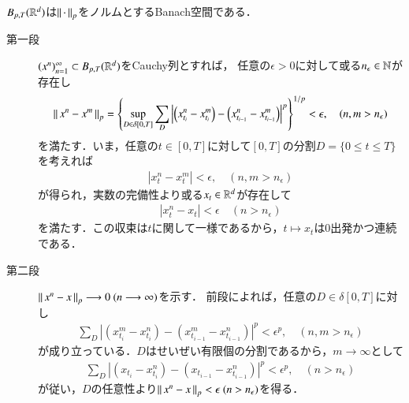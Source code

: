 \begin{screen}
	\begin{thm}
		$B_{p,T}(\mathbb{R}^d)$は$\left\|\, \cdot\, \right\|_{p}$をノルムとするBanach空間である．
	\end{thm}
\end{screen}

\begin{prf}\mbox{}
	\begin{description}
		\item[第一段] $(x^n)_{n=1}^{\infty} \subset B_{p,T}(\mathbb{R}^d)$をCauchy列とすれば，
			任意の$\epsilon > 0$に対して或る$n_\epsilon \in \mathbb{N}$が存在し
			\begin{align}
				\left\|\, x^n - x^m\, \right\|_{p}
				= \left\{ \operatorname*{sup}_{D \in \delta[0,T]} \sum_{D} 
				\left| \left( x^n_{t_i} - x^m_{t_i} \right) 
				- \left(x^n_{t_{i-1}} - x^m_{t_{i-1}} \right) \right|^p \right\}^{1/p} < \epsilon,
				\quad (n,m > n_\epsilon)
			\end{align}
			を満たす．いま，任意の$t \in [0,T]$に対して$[0,T]$の分割$D = \{0 \leq t \leq T\}$
			を考えれば
			\begin{align}
				|x^n_t - x^m_t| < \epsilon,
				\quad (n,m > n_\epsilon)
			\end{align}
			が得られ，実数の完備性より或る$x_t \in \mathbb{R}^d$が存在して
			\begin{align}
				|x^n_t - x_t| < \epsilon
				\quad (n > n_\epsilon)
			\end{align}
			を満たす．この収束は$t$に関して一様であるから，$t \longmapsto x_t$は0出発かつ連続である．
			
		\item[第二段] $\left\|\, x^n - x\, \right\|_{p} \longrightarrow 0\ (n \longrightarrow \infty)$を示す．
			前段によれば，任意の$D \in \delta[0,T]$に対し
			\begin{align}
				\sum_D \left| (x^m_{t_i} - x^n_{t_i}) - (x^m_{t_{i-1}} - x^n_{t_{i-1}}) \right|^p
				< \epsilon^p,
				\quad (n,m > n_\epsilon)
			\end{align}
			が成り立っている．$D$はせいぜい有限個の分割であるから，$m \longrightarrow \infty$として
			\begin{align}
				\sum_D \left| (x_{t_i} - x^n_{t_i}) - (x_{t_{i-1}} - x^n_{t_{i-1}}) \right|^p
				< \epsilon^p,
				\quad (n > n_\epsilon)
			\end{align}
			が従い，$D$の任意性より$\left\|\, x^n - x\, \right\|_{p} < \epsilon\ (n > n_\epsilon)$を得る．
			\QED
	\end{description}
\end{prf}

